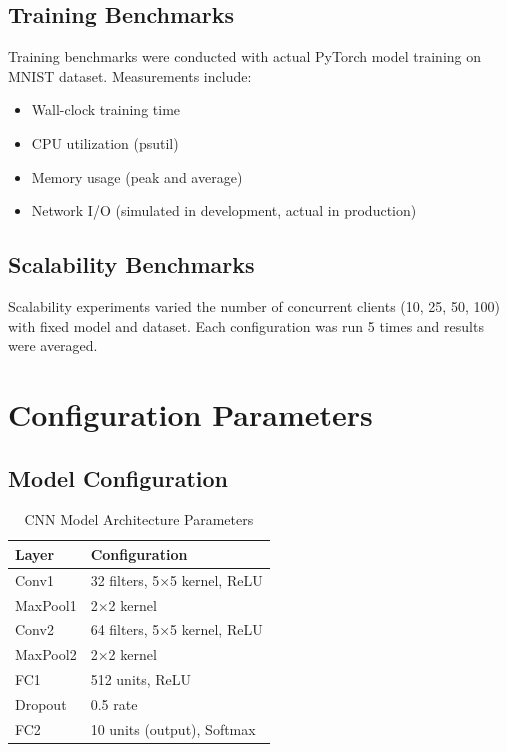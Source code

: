 \documentclass[12pt,a4paper]{article}
\begin{document}
\subsection{Training Benchmarks}

Training benchmarks were conducted with actual PyTorch model training on MNIST dataset. Measurements include:
\begin{itemize}
    \item Wall-clock training time
    \item CPU utilization (psutil)
    \item Memory usage (peak and average)
    \item Network I/O (simulated in development, actual in production)
\end{itemize}

\subsection{Scalability Benchmarks}

Scalability experiments varied the number of concurrent clients (10, 25, 50, 100) with fixed model and dataset. Each configuration was run 5 times and results were averaged.

\section{Configuration Parameters}
\label{appendix:config}

\subsection{Model Configuration}

\begin{table}[H]
\centering
\caption{CNN Model Architecture Parameters}
\begin{tabular}{ll}
\toprule
\textbf{Layer} & \textbf{Configuration} \\
\midrule
Conv1 & 32 filters, 5×5 kernel, ReLU \\
MaxPool1 & 2×2 kernel \\
Conv2 & 64 filters, 5×5 kernel, ReLU \\
MaxPool2 & 2×2 kernel \\
FC1 & 512 units, ReLU \\
Dropout & 0.5 rate \\
FC2 & 10 units (output), Softmax \\
\bottomrule
\end{tabular}
\end{table}
\end{document}
